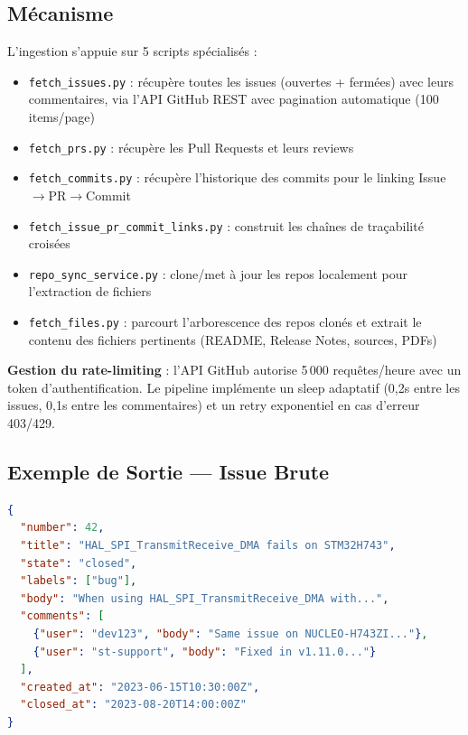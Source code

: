 \documentclass[12pt,a4paper]{report}
\begin{document}
\subsection{Mécanisme}
L'ingestion s'appuie sur 5 scripts spécialisés :
\begin{itemize}
  \item \texttt{fetch\_issues.py} : récupère toutes les issues (ouvertes + fermées) avec leurs commentaires, via l'API GitHub REST avec pagination automatique (100 items/page)
  \item \texttt{fetch\_prs.py} : récupère les Pull Requests et leurs reviews
  \item \texttt{fetch\_commits.py} : récupère l'historique des commits pour le linking Issue$\to$PR$\to$Commit
  \item \texttt{fetch\_issue\_pr\_commit\_links.py} : construit les chaînes de traçabilité croisées
  \item \texttt{repo\_sync\_service.py} : clone/met à jour les repos localement pour l'extraction de fichiers
  \item \texttt{fetch\_files.py} : parcourt l'arborescence des repos clonés et extrait le contenu des fichiers pertinents (README, Release Notes, sources, PDFs)
\end{itemize}

\textbf{Gestion du rate-limiting} : l'API GitHub autorise 5\,000 requêtes/heure avec un token d'authentification. Le pipeline implémente un sleep adaptatif (0,2s entre les issues, 0,1s entre les commentaires) et un retry exponentiel en cas d'erreur 403/429.

\subsection{Exemple de Sortie --- Issue Brute}

\begin{lstlisting}[language=json, caption={Extrait de raw\_issues\_stm32cubeh7.json (issue brute)}]
{
  "number": 42,
  "title": "HAL_SPI_TransmitReceive_DMA fails on STM32H743",
  "state": "closed",
  "labels": ["bug"],
  "body": "When using HAL_SPI_TransmitReceive_DMA with...",
  "comments": [
    {"user": "dev123", "body": "Same issue on NUCLEO-H743ZI..."},
    {"user": "st-support", "body": "Fixed in v1.11.0..."}
  ],
  "created_at": "2023-06-15T10:30:00Z",
  "closed_at": "2023-08-20T14:00:00Z"
}
\end{lstlisting}
\end{document}
